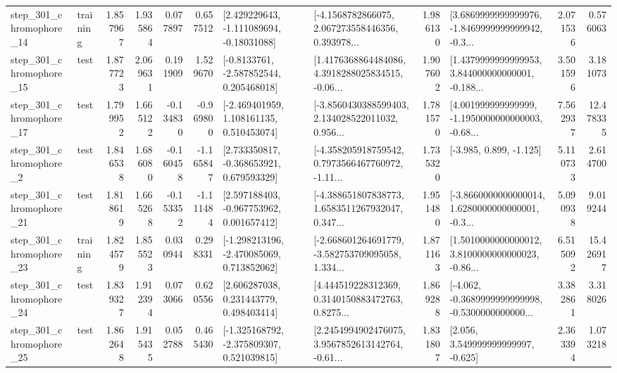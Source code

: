 \begin{tabular}{llrrrrllrlrr}
  step\_301\_chromophore\_14 &  training &      1.857967 &    1.935864 &      0.077897 &  0.657512 &    [2.429229643, -1.111089694, -0.18031088] &  [-4.1568782866075, 2.067273558446356, 0.393978... &       1.986130 &  [3.6869999999999976, -1.8469999999999942, -0.3... &            2.071536 &          0.576063 \\
  step\_301\_chromophore\_15 &      test &      1.877723 &    2.069631 &      0.191909 &  1.529670 &     [-0.8133761, -2.587852544, 0.205468018] &  [1.4176368864484086, 4.3918288025834515, -0.06... &       1.907602 &  [1.4379999999999953, 3.844000000000001, -0.188... &            3.501596 &          3.181073 \\
  step\_301\_chromophore\_17 &      test &      1.799952 &    1.665122 &     -0.134830 & -0.969800 &    [-2.469401959, 1.108161135, 0.510453074] &  [-3.8560430388599403, 2.134028522011032, 0.956... &       1.781570 &  [4.001999999999999, -1.1950000000000003, -0.68... &            7.562937 &         12.478335 \\
   step\_301\_chromophore\_2 &      test &      1.846538 &    1.686080 &     -0.160458 & -1.165847 &    [2.733350817, -0.368653921, 0.679593329] &  [-4.358205918759542, 0.7973566467760972, -1.11... &       1.735320 &                            [-3.985, 0.899, -1.125] &            5.110733 &          2.614700 \\
  step\_301\_chromophore\_21 &      test &      1.818619 &    1.665268 &     -0.153352 & -1.111484 &    [2.597188403, -0.967753962, 0.001657412] &  [-4.388651807838773, 1.6583511267932047, 0.347... &       1.951480 &  [-3.8660000000000014, 1.6280000000000001, -0.3... &            5.090938 &          9.019244 \\
  step\_301\_chromophore\_23 &  training &      1.824579 &    1.855523 &      0.030944 &  0.298331 &   [-1.298213196, -2.470085069, 0.713852062] &  [-2.668601264691779, -3.582753709095058, 1.334... &       1.871163 &  [1.5010000000000012, 3.8100000000000023, -0.86... &            6.515092 &         15.426917 \\
  step\_301\_chromophore\_24 &      test &      1.839327 &    1.912394 &      0.073066 &  0.620556 &     [2.606287038, 0.231443779, 0.498403414] &  [4.444519228312369, 0.3140150883472763, 0.8275... &       1.869288 &  [-4.062, -0.3689999999999998, -0.5300000000000... &            3.382861 &          3.318026 \\
  step\_301\_chromophore\_25 &      test &      1.862648 &    1.915435 &      0.052788 &  0.465430 &   [-1.325168792, -2.375809307, 0.521039815] &  [2.2454994902476075, 3.9567852613142764, -0.61... &       1.831807 &                 [2.056, 3.549999999999997, -0.625] &            2.363394 &          1.073218 \\

\end{tabular}
